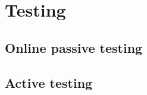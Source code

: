 %
\chapter{Testing}
\label{sec:testing}



\section{Online passive testing}
\label{sec:testing:onpassive}

\section{Active testing}
\label{sec:testing:active}
